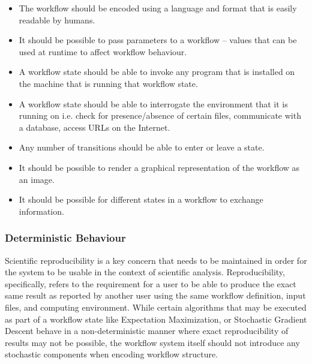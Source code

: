\begin{itemize}
\item The workflow should be encoded using a language and format that is easily readable by humans.
\item It should be possible to pass parameters to a workflow -- values that can be used at runtime to affect workflow behaviour.
\item A workflow state should be able to invoke any program that is installed on the machine that is running that workflow state.
\item A workflow state should be able to interrogate the environment that it is running on i.e. check for presence/absence of certain files, communicate with a database, access URLs on the Internet.
\item Any number of transitions should be able to enter or leave a state.
\item It should be possible to render a graphical representation of the workflow as an image.
\item It should be possible for different states in a workflow to exchange information.
\end{itemize}

\subsubsection{Deterministic Behaviour}
Scientific reproducibility is a key concern that needs to be maintained in order for the system to be usable in the context of scientific analysis. Reproducibility, specifically, refers to the requirement for a user to be able to produce the exact same result as reported by another user using the same workflow definition, input files, and computing environment. While certain algorithms that may be executed as part of a workflow state like Expectation Maximization\autocite{moon1996expectation}, or Stochastic Gradient Descent\autocite{bottou2010large} behave in a non-deterministic manner where exact reproducibility of results may not be possible, the workflow system itself should not introduce any stochastic components when encoding workflow structure.

